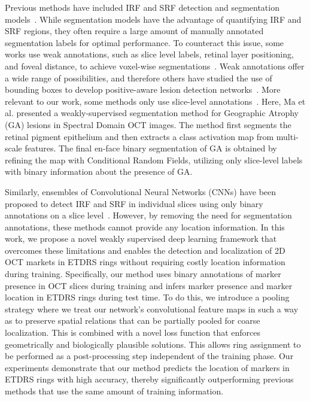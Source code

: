 Previous methods have included IRF and SRF detection and segmentation models~. While segmentation models have the advantage of quantifying IRF and SRF regions, they often require a large amount of manually annotated segmentation labels for optimal performance. To counteract this issue, some works use weak annotations, such as slice level labels, retinal layer positioning, and foveal distance, to achieve voxel-wise segmentations~. Weak annotations offer a wide range of possibilities, and therefore others have studied the use of bounding boxes to develop positive-aware lesion detection networks~. More relevant to our work, some methods only use slice-level annotations~. Here, Ma et al. presented a weakly-supervised segmentation method for Geographic Atrophy (GA) lesions in Spectral Domain OCT images.  The method first segments the retinal pigment epithelium and then extracts a class activation map from multi-scale features. The final en-face binary segmentation of GA is obtained by refining the map with Conditional Random Fields, utilizing only slice-level labels with binary information about the presence of GA.


Similarly, ensembles of Convolutional Neural Networks (CNNs) have been proposed to detect IRF and SRF in individual slices using only binary annotations on a slice level~. However, by removing the need for segmentation annotations, these methods cannot provide any location information.  In this work, we propose a novel weakly supervised deep learning framework that overcomes these limitations and enables the detection and localization of 2D OCT markets in ETDRS rings without requiring costly location information during training. Specifically, our method uses binary annotations of marker presence in OCT slices during training and infers marker presence and marker location in ETDRS rings during test time. To do this, we introduce a pooling strategy where we treat our network's convolutional feature maps in such a way as to preserve spatial relations that can be partially pooled for coarse localization. This is combined with a novel loss function that enforces geometrically and biologically plausible solutions. This allows ring assignment to be performed as a post-processing step independent of the training phase. Our experiments demonstrate that our method predicts the location of markers in ETDRS rings with high accuracy, thereby significantly outperforming previous methods that use the same amount of training information. 